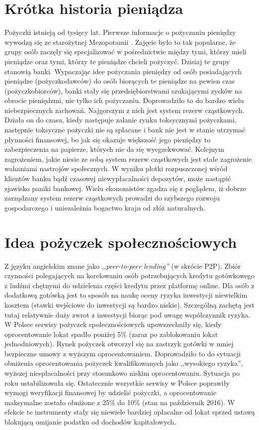 \documentclass[a4paper,twoside,titlepage,openright]{book}
\begin{document}
\section{Krótka historia pieniądza}
Pożyczki istnieją od tysięcy lat. Pierwsze informacje o pożyczaniu pieniędzy wywodzą się ze starożytnej Mezopotamii \cite{financingCivilization}. Zajęcie było to tak popularne, że grupy osób zaczęły się specjalizować w pośrednictwie między tymi, którzy mieli pieniądze oraz tymi, którzy te pieniądze chcieli pożyczyć. Dzisiaj te grupy stanowią banki. Wypaczając idee pożyczania pieniędzy od osób posiadających pieniądze (pożyczkodawców) do osób biorących te pieniądze na pewien czas (pożyczkobiorców), banki stały się przedsiębiorstwami szukającymi zysków na obrocie pieniędzmi, nie tylko ich pożyczaniu. Doprowadziło to do bardzo wielu niebezpiecznych zachowań. Najgorszym z nich jest system rezerw cząstkowych. Działa on do czasu, kiedy następuje zalanie rynku toksycznymi pożyczkami, następnie toksyczne pożyczki nie są spłacane i bank nie jest w stanie utrzymać płynności finansowej, bo jak się okazuje większość jego pieniędzy to zabezpieczenia na papierze, których nie da się wyegzekwować. Kolejnym zagrożeniem, jakie niesie ze sobą system rezerw cząstkowych jest stałe zagrożenie wahaniami nastrojów społecznych. W wyniku plotki rozpuszczonej wśród klientów banku bądź czasowej niewypłacalności depozytów, może nastąpić zjawisko paniki bankowej. Wielu ekonomistów zgadza się z poglądem, iż dobrze zarządzany system rezerw cząstkowych prowadzi do szybszego rozwoju gospodarczego i uniezależnia bogactwo kraju od złóż naturalnych.\cite{fractionalReserveBanking}

\section{Idea pożyczek społecznościowych}
Z języku angielskim znane jako \textit{,,peer-to-peer lending''} (w skrócie P2P). Zbiór czynności polegających na korelowaniu osób potrzebujących kredytu gotówkowego z ludźmi chętnymi do udzielenia części kredytu przez platformę online.\cite{P2P} Dla osób z dodatkową gotówką jest to sposób na naukę oceny ryzyka inwestycji niewielkim kosztem (stawki wejściowe do inwestycji są bardzo niskie). Szczególną zachętą jest tutaj relatywnie duży zwrot z inwestycji biorąc pod uwagę współczynnik ryzyka. W Polsce serwisy pożyczek społecznościowych upowszechniły się, kiedy oprocentowanie lokat spadło poniżej 5\% (zaraz po zablokowaniu lokat jednodniowych).\cite{antybelkowe} Rynek pożyczek otworzył się na zastrzyk gotówki w mniej bezpieczne umowy z wyższym oprocentowaniem. Doprowadziło to do sytuacji obniżenia oprocentowania pożyczek kwalifikowanych jako ,,wysokiego ryzyka'', wyższej niespłacalności przy stosunkowo niskim oprocentowaniu. Sytuacja po roku ustabilizowała się. Ostatecznie wszystkie serwisy w Polsce poprawiły wymogi weryfikacji finansowej by udzielić pożyczki, a oprocentowanie maksymalne zostało obniżone z 25\% do 10\% (stan na październik 2016). W efekcie te instrumenty stały się niewiele bardziej opłacalne od lokat sprzed ustawą blokującą omijanie podatku od dochodów kapitałowych.
 
\end{document}
